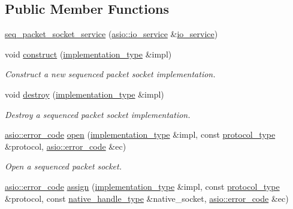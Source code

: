 \subsection*{Public Member Functions}
\begin{DoxyCompactItemize}
\item 
\hyperlink{classasio_1_1seq__packet__socket__service_acae0e0024304d80742881a8458f4e655}{seq\+\_\+packet\+\_\+socket\+\_\+service} (\hyperlink{classasio_1_1io__service}{asio\+::io\+\_\+service} \&\hyperlink{classasio_1_1io__service}{io\+\_\+service})
\item 
void \hyperlink{classasio_1_1seq__packet__socket__service_abcaf4df14a230620b702153bd7cbb290}{construct} (\hyperlink{classasio_1_1seq__packet__socket__service_a6e1d2027450d7a5d8ea7896a3de0c8ff}{implementation\+\_\+type} \&impl)
\begin{DoxyCompactList}\small\item\em Construct a new sequenced packet socket implementation. \end{DoxyCompactList}\item 
void \hyperlink{classasio_1_1seq__packet__socket__service_a8dc743b0eeca02d2285d59837209f754}{destroy} (\hyperlink{classasio_1_1seq__packet__socket__service_a6e1d2027450d7a5d8ea7896a3de0c8ff}{implementation\+\_\+type} \&impl)
\begin{DoxyCompactList}\small\item\em Destroy a sequenced packet socket implementation. \end{DoxyCompactList}\item 
\hyperlink{classasio_1_1error__code}{asio\+::error\+\_\+code} \hyperlink{classasio_1_1seq__packet__socket__service_a449ddbcaacfa3f510fbc1884236d1b60}{open} (\hyperlink{classasio_1_1seq__packet__socket__service_a6e1d2027450d7a5d8ea7896a3de0c8ff}{implementation\+\_\+type} \&impl, const \hyperlink{classasio_1_1seq__packet__socket__service_a34f0604b58ba016dc75d31f86d291458}{protocol\+\_\+type} \&protocol, \hyperlink{classasio_1_1error__code}{asio\+::error\+\_\+code} \&ec)
\begin{DoxyCompactList}\small\item\em Open a sequenced packet socket. \end{DoxyCompactList}\item 
\hyperlink{classasio_1_1error__code}{asio\+::error\+\_\+code} \hyperlink{classasio_1_1seq__packet__socket__service_ac2cbba09d91e32beaff0e49b8f20e6ab}{assign} (\hyperlink{classasio_1_1seq__packet__socket__service_a6e1d2027450d7a5d8ea7896a3de0c8ff}{implementation\+\_\+type} \&impl, const \hyperlink{classasio_1_1seq__packet__socket__service_a34f0604b58ba016dc75d31f86d291458}{protocol\+\_\+type} \&protocol, const \hyperlink{classasio_1_1seq__packet__socket__service_a80d5af14e0e6580995b0a64de71f6f9a}{native\+\_\+handle\+\_\+type} \&native\+\_\+socket, \hyperlink{classasio_1_1error__code}{asio\+::error\+\_\+code} \&ec)

\end{DoxyCompactItemize}
